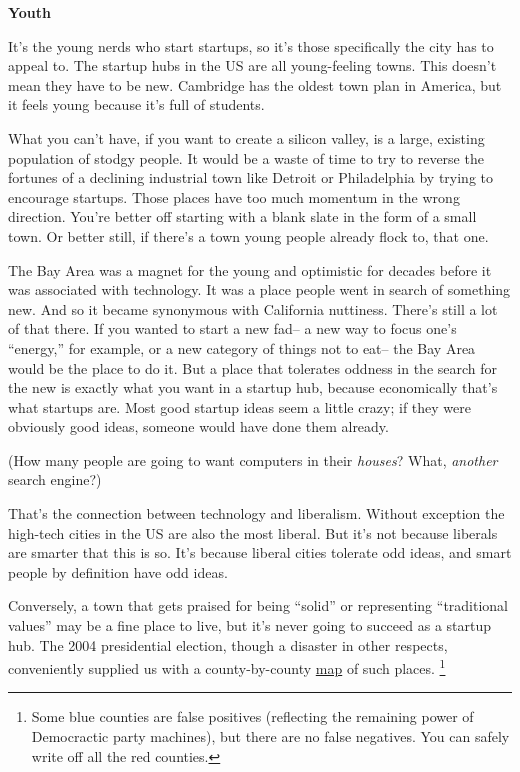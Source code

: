 \textbf{Youth}

It's the young nerds who start startups, so it's those specifically the
city has to appeal to. The startup hubs in the US are all young-feeling
towns. This doesn't mean they have to be new. Cambridge has the oldest
town plan in America, but it feels young because it's full of students.

What you can't have, if you want to create a silicon valley, is a large,
existing population of stodgy people. It would be a waste of time to try
to reverse the fortunes of a declining industrial town like Detroit or
Philadelphia by trying to encourage startups. Those places have too much
momentum in the wrong direction. You're better off starting with a blank
slate in the form of a small town. Or better still, if there's a town
young people already flock to, that one.

The Bay Area was a magnet for the young and optimistic for decades
before it was associated with technology. It was a place people went in
search of something new. And so it became synonymous with California
nuttiness. There's still a lot of that there. If you wanted to start a
new fad-- a new way to focus one's ``energy,'' for example, or a new
category of things not to eat-- the Bay Area would be the place to do
it. But a place that tolerates oddness in the search for the new is
exactly what you want in a startup hub, because economically that's what
startups are. Most good startup ideas seem a little crazy; if they were
obviously good ideas, someone would have done them already.

(How many people are going to want computers in their \emph{houses}?
What, \emph{another} search engine?)

That's the connection between technology and liberalism. Without
exception the high-tech cities in the US are also the most liberal. But
it's not because liberals are smarter that this is so. It's because
liberal cities tolerate odd ideas, and smart people by definition have
odd ideas.

Conversely, a town that gets praised for being ``solid'' or representing
``traditional values'' may be a fine place to live, but it's never going
to succeed as a startup hub. The 2004 presidential election, though a
disaster in other respects, conveniently supplied us with a
county-by-county
\href{http://www-personal.umich.edu/~mejn/election/2004/countymaplinearlarge.png}{map}
of such places. \footnote{Some blue counties are false positives (reflecting the remaining
power of Democractic party machines), but there are no false negatives.
You can safely write off all the red counties.}

